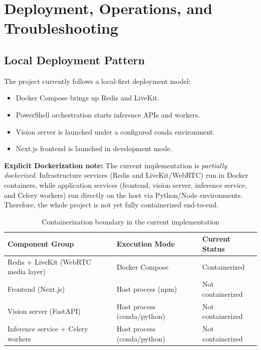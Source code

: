 \documentclass[12pt,a4paper]{report}
\begin{document}
\chapter{Deployment, Operations, and Troubleshooting}
\section{Local Deployment Pattern}
The project currently follows a local-first deployment model:
\begin{itemize}[leftmargin=1.5em]
\item Docker Compose brings up Redis and LiveKit.
\item PowerShell orchestration starts inference APIs and workers.
\item Vision server is launched under a configured conda environment.
\item Next.js frontend is launched in development mode.
\end{itemize}

\textbf{Explicit Dockerization note:} The current implementation is \textit{partially dockerized}. Infrastructure services (Redis and LiveKit/WebRTC) run in Docker containers, while application services (frontend, vision server, inference service, and Celery workers) run directly on the host via Python/Node environments. Therefore, the whole project is not yet fully containerized end-to-end.

\begin{table}[H]
\centering
\caption{Containerization boundary in the current implementation}
\begin{tabularx}{\textwidth}{>{\raggedright\arraybackslash}p{5.0cm} >{\raggedright\arraybackslash}p{3.0cm} Y}
\toprule
\textbf{Component Group} & \textbf{Execution Mode} & \textbf{Current Status} \\
\midrule
Redis + LiveKit (WebRTC media layer) & Docker Compose & Containerized \\
Frontend (Next.js) & Host process (npm) & Not containerized \\
Vision server (FastAPI) & Host process (conda/python) & Not containerized \\
Inference service + Celery workers & Host process (conda/python) & Not containerized \\
\bottomrule
\end{tabularx}
\end{table}
\end{document}
